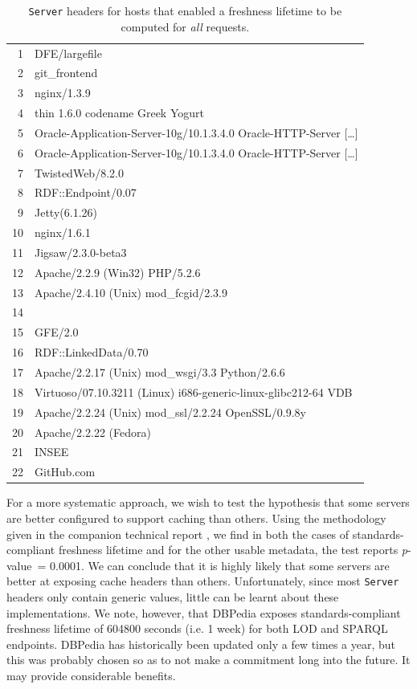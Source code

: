 \documentclass{llncs}
\newcommand{\pvalue}{\textit{p}-value\ }
\newcommand{\httph}[1]{\texttt{#1}}
\begin{document}
\begin{table}[h]
  \caption{\httph{Server} headers for hosts that enabled a freshness
    lifetime to be computed for \emph{all} requests.}\label{tab:servers}
\begin{center}
\begin{tabular}{rl}
  \hline
  1 & DFE/largefile \\ 
  2 & git\_frontend \\ 
  3 & nginx/1.3.9 \\ 
  4 & thin 1.6.0 codename Greek Yogurt \\ 
  5 & Oracle-Application-Server-10g/10.1.3.4.0 Oracle-HTTP-Server [\ldots]\\
  6 & Oracle-Application-Server-10g/10.1.3.4.0 Oracle-HTTP-Server [\ldots]\\
  7 & TwistedWeb/8.2.0 \\ 
  8 & RDF::Endpoint/0.07 \\ 
  9 & Jetty(6.1.26) \\ 
  10 & nginx/1.6.1 \\ 
  11 & Jigsaw/2.3.0-beta3 \\ 
  12 & Apache/2.2.9 (Win32) PHP/5.2.6 \\ 
  13 & Apache/2.4.10 (Unix) mod\_fcgid/2.3.9 \\ 
  14 &  \\ 
  15 & GFE/2.0 \\ 
  16 & RDF::LinkedData/0.70 \\ 
  17 & Apache/2.2.17 (Unix) mod\_wsgi/3.3 Python/2.6.6 \\ 
  18 & Virtuoso/07.10.3211 (Linux) i686-generic-linux-glibc212-64  VDB \\ 
  19 & Apache/2.2.24 (Unix) mod\_ssl/2.2.24 OpenSSL/0.9.8y \\ 
  20 & Apache/2.2.22 (Fedora) \\ 
  21 & INSEE \\ 
  22 & GitHub.com \\ 
   \hline
\end{tabular}
\end{center}
\end{table}



For a more systematic approach, we wish to test the hypothesis that
some servers are better configured to support caching than others.
Using the methodology given in the companion technical report
\cite{kjernsmo_add_survey_2015}, we find in
both the cases of standards-compliant freshness lifetime and for the other
usable metadata, the test reports \pvalue = 0.0001. We can conclude
that it is highly likely that some servers are better at exposing
cache headers than others. Unfortunately, since most \httph{Server}
headers only contain generic values, little can be learnt about these
implementations. We note, however, that DBPedia exposes
standards-compliant freshness lifetime of 604800 seconds (i.e. 1 week) for
both LOD and SPARQL endpoints. DBPedia has historically been updated
only a few times a year, but this was probably chosen so as to not
make a commitment long into the future. It may provide considerable benefits.
\end{document}

